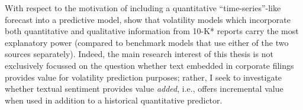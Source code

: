 
With respect to the motivation of including a quantitative \enquote{time-series}-like forecast into a predictive model, \textcite{Rekabsaz2017} show that volatility models which incorporate both quantitative and qualitative information from 10-K* reports carry the most explanatory power (compared to benchmark models that use either of the two sources separately). Indeed, the main research interest of this thesis is not exclusively focussed on the question whether text embedded in corporate filings provides value for volatility prediction purposes; rather, I seek to investigate whether textual sentiment provides value \textit{added}, i.e., offers incremental value when used in addition to a historical quantitative predictor. 

